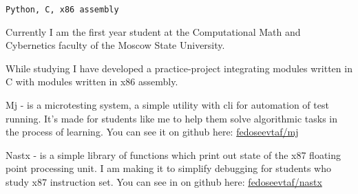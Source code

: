 


\begin{titlepage}




\begin{centering}
\texttt{Python, C, x86 assembly}

\end{centering}



Currently I am the first year student at the Computational
Math and Cybernetics faculty of the Moscow State University.

While studying I have developed a practice-project integrating
modules written in C with modules written in x86 assembly.



Mj - is a microtesting system, a simple utility with cli
for automation of test running. It's made for students like
me to help them solve algorithmic tasks in the process of
learning. You can see it on github here:
\href{https://github.com/fedoseevtaf/mj}{fedoseevtaf/mj}


Nastx - is a simple library of functions which print out
state of the x87 floating point processing unit. I am making
it to simplify debugging for students who study x87
instruction set. You can see in on github here:
\href{https://github.com/fedoseevtaf/nastx}{fedoseevtaf/nastx}

\end{titlepage}



